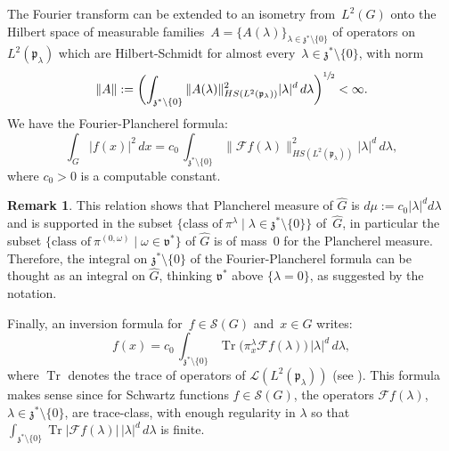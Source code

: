 \documentclass[JEP,XML,SOM,Unicode,published]{cedram}
\let\mathcal\mathscr
\let\sep\mid
\DeclareMathOperator{\Tr}{Tr}
\theoremstyle{plain}
\theoremstyle{definition}
\newtheorem{remark}[theorem]{Remark}
\begin{document}
The Fourier transform can be extended to an isometry from~$L^2(G)$ onto the Hilbert
space of measurable families~$ A = \{ A (\lambda) \}_{\lambda \in{\mathfrak z}^*\setminus \{0\}}$
of operators on~$L^2(\mathfrak p_\lambda)$ which are
Hilbert-Schmidt for almost every~$\lambda\in{\mathfrak z}^*\setminus \{0\}$, with norm
\[
\|A\| := \biggl(\int_{\mathfrak z^* \setminus\{0\}}
\|A (\lambda)\|_{HS (L^2(\mathfrak p_\lambda))}^2 |\lambda|^d \, d\lambda
\biggr)^{\sfrac{1}{2}}<\infty.
\]
We have the Fourier-Plancherel formula:
\[
\int_G |f(x)|^2 \, dx
= c_0 \, \int_{\mathfrak z^* \setminus\{0\}} \|{\mathcal F}f(\lambda)\|_{HS(L^2(\mathfrak p_\lambda))}^2 |\lambda|^d \, d\lambda,
\]
where $c_0>0$ is a computable constant.

\begin{remark}\label{rem:Ghat}
This relation shows that Plancherel measure of $\widehat G$ is $d\mu:= c_0|\lambda|^d d\lambda$ and is supported in the subset $\{\mbox{class of} \ \pi^\lambda \sep \lambda \in \mathfrak z^* \setminus\{0\}\}$ of~$\widehat G$, in particular the subset $\{\mbox{class of} \ \pi^{(0,\omega)} \sep \omega \in \mathfrak v^* \}$ of $\widehat G$ is of mass~$0$ for the Plancherel measure. Therefore, the integral on $\mathfrak z^*\setminus \{0\}$ of the Fourier-Plancherel formula can be thought as an integral on $\widehat G$, thinking $\mathfrak v^*$ above $\{\lambda=0\}$, as suggested by the notation.
\end{remark}

Finally, an inversion formula for~$ f \in {\mathcal S}(G)$ and~$x\in G$ writes:
\begin{equation}
\label{inversionformula} f(x)
= c_0 \, \int_{\mathfrak z^* \setminus\{0\}} \Tr \Big(\pi^{\lambda}_{x} {\mathcal F}f(\lambda) \Big)\, |\lambda|^d\,d\lambda,
\end{equation}
where $\Tr$ denotes the trace of operators of ${\mathcal L}(L^2({\mathfrak p}_\lambda))$ (see \cite[Th.\,2.7]{Tay}).
This formula makes sense since for Schwartz functions $f \in {\mathcal S}(G)$, the operators ${\mathcal F}f(\lambda)$, \hbox{$\lambda\!\in\!\mathfrak z^*\!\setminus\!\{0\}$}, are trace-class, with enough regularity in $\lambda$ so that $\int_{\mathfrak z^* \setminus\{0\}} \Tr \Big| {\mathcal F}f(\lambda) \Big|\, |\lambda|^d\,d\lambda$ is finite.
\end{document}
